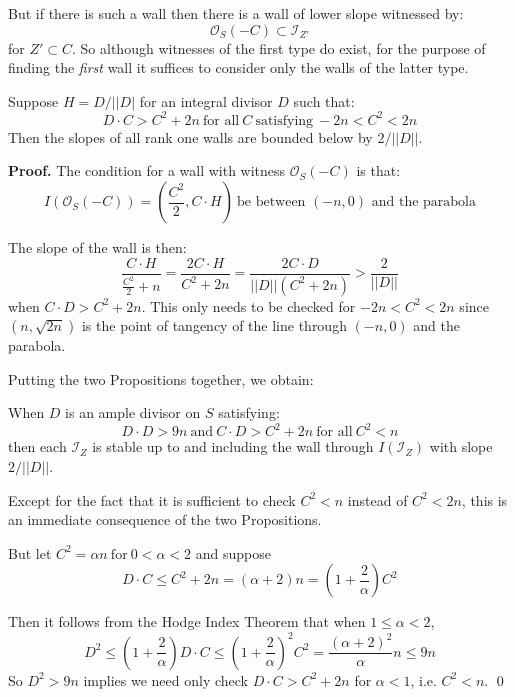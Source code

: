 \documentclass{amsart}
\begin{document}
\medskip

But if there is such a wall  then there is a wall of lower slope witnessed by: 
\[ {\mathcal O}_S(-C) \subset {\mathcal I}_{Z'} \] 
for $Z' \subset C$. So although witnesses of the first type do
exist, for the purpose of finding the {\it first} wall  it suffices to consider only the walls of the latter type. 

\medskip

 Suppose $H = D/||D|$ for an integral divisor $D$ such that: 
\[ D \cdot C > C^2 + 2n \ \mbox{for all} \ C \ \mbox{satisfying} \ -2n < C^2 < 2n \] 
Then the slopes of all rank one walls are bounded below by $2/||D||$. 

\medskip

{\bf Proof.} The condition for a wall with witness ${\mathcal O}_S(-C)$ is that: 
\[ I({\mathcal O}_S(-C)) = \left( \frac{C^2}2, C \cdot H \right) \ \mbox{be between $(-n,0)$ and the parabola}  \] 

The slope of the wall is then: 
\[ \frac{ C\cdot H}{\frac{C^2}2 + n} = \frac{2 C \cdot H} {C^2 + 2n} = \frac {2C \cdot D}{||D|| (C^2 + 2n)}> \frac 2{||D||} \] 
when $C\cdot D > C^2 + 2n$. This only needs to be checked 
for $-2n < C^2 < 2n$ since $(n,\sqrt{2n})$ is the point of tangency of the line through $(-n,0)$ and the parabola.

\medskip

Putting the two Propositions together, we obtain: 

\medskip

 When $D$ is an ample divisor on $S$ satisfying:
\[ D \cdot D > 9n \ \mbox{and} \ C \cdot D > C^2 + 2n \ \mbox{for all} \ C^2 < n \] 
then each ${\mathcal I}_Z$ is stable up to and including the wall through $I({\mathcal I}_Z)$ with slope $2/||D||$.  

\medskip

 Except for the fact that it is sufficient to check $C^2 < n$ instead of $C^2 < 2n$, this is an immediate consequence of the two 
Propositions. 

\medskip

But let
$C^2 = \alpha n \ \mbox{for} \ 0 < \alpha < 2$ and suppose
\[  D \cdot C \le C^2 + 2n  = (\alpha + 2)n = \left( 1 + \frac 2\alpha\right)C^2 \] 

Then it follows from the Hodge Index Theorem that when $1 \le \alpha < 2$, 
\[ D^2 \le \left( 1 + \frac 2\alpha\right) D\cdot C \le \left( 1 + \frac 2\alpha\right)^2 C^2 = \frac{(\alpha + 2)^2}{\alpha} n \le 9n  \] 
 So $D^2 > 9n$  implies we need only check $D \cdot C > C^2 + 2n$ for $\alpha < 1$, i.e. $C^2 < n$.  \qed
\end{document}
